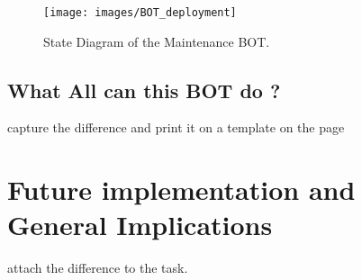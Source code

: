 \begin{figure}[H]
  \centering
  \texttt{[image: images/BOT\_deployment]}
  \caption[State Diagram of the Maintenance BOT]{State Diagram of the Maintenance BOT.}\label{fig:BOT_deployment}
\end{figure}

\subsection{What All can this BOT do ?}
capture the difference and print it on a template on the page


\section{Future implementation and General Implications }
attach the difference to the task.

		

